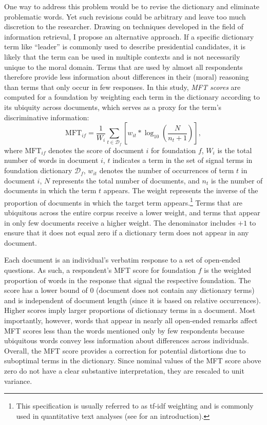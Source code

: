 \documentclass[12pt]{article}
\begin{document}
One way to address this problem would be to revise the dictionary and eliminate problematic words. Yet such revisions could be arbitrary and leave too much discretion to the researcher. Drawing on techniques developed in the field of information retrieval, I propose an alternative approach. If a specific dictionary term like ``leader'' is commonly used to describe presidential candidates, it is likely that the term can be used in multiple contexts and is not necessarily unique to the moral domain. Terms that are used by almost all respondents therefore provide less information about differences in their (moral) reasoning than terms that only occur in few responses. In this study, \textit{MFT scores} are computed for a foundation by weighting each term in the dictionary according to its ubiquity across documents, which serves as a proxy for the term's discriminative information:
\begin{equation}\label{eq:tfidf}
\text{MFT}_{if} = \dfrac{1}{W_i} \sum_{t \in \mathcal{D}_f} \left[ w_{it} * \log_{10}\left( \dfrac{N}{n_t+1}\right) \right],
\end{equation}
where $\text{MFT}_{if}$ denotes the score of document $i$ for foundation $f$, $W_i$ is the total number of words in document $i$, $t$ indicates a term in the set of signal terms in foundation dictionary $\mathcal{D}_f$, $w_{it}$ denotes the number of occurrences of term $t$ in document $i$, $N$ represents the total number of documents, and $n_t$ is the number of documents in which the term $t$ appears. The weight represents the inverse of the proportion of documents in which the target term appears.\footnote{This specification is usually referred to as tf-idf weighting and is commonly used in quantitative text analyses (see \citealt[ch. 6]{manning2008introduction} for an introduction).} Terms that are ubiquitous across the entire corpus receive a lower weight, and terms that appear in only few documents receive a higher weight. The denominator includes $+1$ to ensure that it does not equal zero if a dictionary term does not appear in any document.

Each document is an individual's verbatim response to a set of open-ended questions. As such, a respondent's MFT score for foundation $f$ is the weighted proportion of words in the response that signal the respective foundation. The score has a lower bound of 0 (document does not contain any dictionary terms) and is independent of document length (since it is based on relative occurrences). Higher scores imply larger proportions of dictionary terms in a document. Most importantly, however, words that appear in nearly all open-ended remarks affect MFT scores less than the words mentioned only by few respondents because ubiquitous words convey less information about differences across individuals. Overall, the MFT score provides a correction for potential distortions due to suboptimal terms in the dictionary. Since nominal values of the MFT score above zero do not have a clear substantive interpretation, they are rescaled to unit variance.
\end{document}
